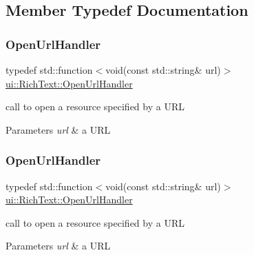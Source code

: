 \subsection{Member Typedef Documentation}
\mbox{\label{classui_1_1RichText_ad3631ae61d204f1d9576f5923bbd762e}} 
\subsubsection{\texorpdfstring{Open\+Url\+Handler}{OpenUrlHandler}\hspace{0.1cm}{\footnotesize\ttfamily [1/2]}}
{\footnotesize\ttfamily typedef std\+::function$<$void(const std\+::string\& url)$>$ \hyperlink{classui_1_1RichText_ad3631ae61d204f1d9576f5923bbd762e}{ui\+::\+Rich\+Text\+::\+Open\+Url\+Handler}}



call to open a resource specified by a U\+RL 


\begin{DoxyParams}{Parameters}
{\em url} & a U\+RL \\
\hline
\end{DoxyParams}
\mbox{\label{classui_1_1RichText_ad3631ae61d204f1d9576f5923bbd762e}} 
\subsubsection{\texorpdfstring{Open\+Url\+Handler}{OpenUrlHandler}\hspace{0.1cm}{\footnotesize\ttfamily [2/2]}}
{\footnotesize\ttfamily typedef std\+::function$<$void(const std\+::string\& url)$>$ \hyperlink{classui_1_1RichText_ad3631ae61d204f1d9576f5923bbd762e}{ui\+::\+Rich\+Text\+::\+Open\+Url\+Handler}}



call to open a resource specified by a U\+RL 


\begin{DoxyParams}{Parameters}
{\em url} & a U\+RL \\
\hline
\end{DoxyParams}
\mbox{\label{classui_1_1RichText_a195114ba2bddc97248b8a0c400d489f7}} 
